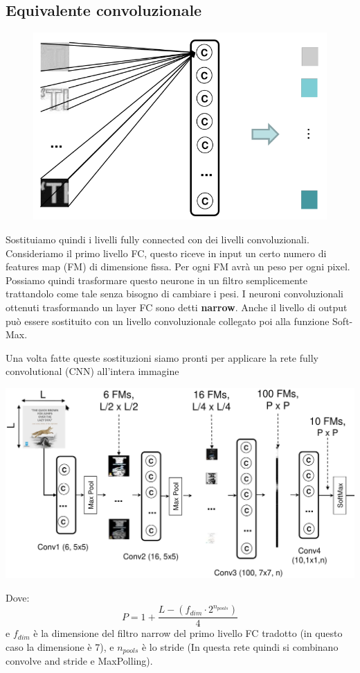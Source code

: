 \subsection{Equivalente convoluzionale}
\begin{figure}
	\vspace{-.25cm}
	\centering
	\includegraphics[width=\linewidth]{Picture/FC_To_CNN}
\end{figure}
Sostituiamo quindi i livelli fully connected con dei livelli convoluzionali. Consideriamo il primo livello FC, questo riceve in input un certo numero di features map (FM) di dimensione fissa. Per ogni FM avrà un peso per ogni pixel. Possiamo quindi trasformare questo neurone in un filtro semplicemente trattandolo come tale senza bisogno di cambiare i pesi. I neuroni convoluzionali ottenuti trasformando un layer FC sono detti \textbf{narrow}. Anche il livello di output può essere sostituito con un livello convoluzionale collegato poi alla funzione Soft-Max.

Una volta fatte queste sostituzioni siamo pronti per applicare la rete fully convolutional (CNN) all'intera immagine
\begin{center}
	\includegraphics[width=.75\linewidth]{Picture/CNN}
\end{center}
Dove:
\begin{equation}
	P = 1 + \frac{L -(f_{dim} \cdot 2^{n_{pools}})}{4}
\end{equation}
e $f_{dim}$ è la dimensione del filtro narrow del primo livello FC tradotto (in questo caso la dimensione è 7), e $n_{pools}$ è lo stride (In questa rete quindi si combinano convolve and stride e MaxPolling).
